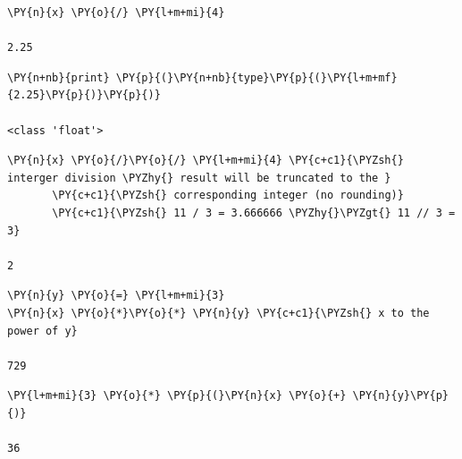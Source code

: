 \begin{tcolorbox}[breakable, size=fbox, boxrule=1pt, pad at break*=1mm, colback=cellbackground, colframe=cellborder]            
\begin{Verbatim}[commandchars=\\\{\}]
\PY{n}{x} \PY{o}{/} \PY{l+m+mi}{4}

2.25
\end{Verbatim}
\end{tcolorbox}

\begin{tcolorbox}[breakable, size=fbox, boxrule=1pt, pad at break*=1mm, colback=cellbackground, colframe=cellborder]            
\begin{Verbatim}[commandchars=\\\{\}]
\PY{n+nb}{print} \PY{p}{(}\PY{n+nb}{type}\PY{p}{(}\PY{l+m+mf}{2.25}\PY{p}{)}\PY{p}{)}

<class 'float'>
\end{Verbatim}
\end{tcolorbox}

\begin{tcolorbox}[breakable, size=fbox, boxrule=1pt, pad at break*=1mm, colback=cellbackground, colframe=cellborder]            
\begin{Verbatim}[commandchars=\\\{\}]
\PY{n}{x} \PY{o}{/}\PY{o}{/} \PY{l+m+mi}{4} \PY{c+c1}{\PYZsh{} interger division \PYZhy{} result will be truncated to the }
       \PY{c+c1}{\PYZsh{} corresponding integer (no rounding)}
       \PY{c+c1}{\PYZsh{} 11 / 3 = 3.666666 \PYZhy{}\PYZgt{} 11 // 3 = 3}

2
\end{Verbatim}
\end{tcolorbox}

\begin{tcolorbox}[breakable, size=fbox, boxrule=1pt, pad at break*=1mm, colback=cellbackground, colframe=cellborder]            
\begin{Verbatim}[commandchars=\\\{\}]
\PY{n}{y} \PY{o}{=} \PY{l+m+mi}{3}
\PY{n}{x} \PY{o}{*}\PY{o}{*} \PY{n}{y} \PY{c+c1}{\PYZsh{} x to the power of y}

729
\end{Verbatim}
\end{tcolorbox}

\begin{tcolorbox}[breakable, size=fbox, boxrule=1pt, pad at break*=1mm, colback=cellbackground, colframe=cellborder]            
\begin{Verbatim}[commandchars=\\\{\}]
\PY{l+m+mi}{3} \PY{o}{*} \PY{p}{(}\PY{n}{x} \PY{o}{+} \PY{n}{y}\PY{p}{)}

36
\end{Verbatim}
\end{tcolorbox}


